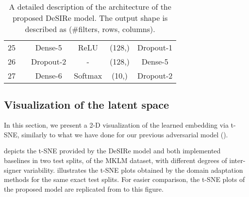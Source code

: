 \begin{table}[t]
\begin{tabular}{c|c|c|c|c|c}
            25                                                          &                                                                 & Dense-5                                                                           & ReLU                                                              & (128,)                & Dropout-1                                                                                \\
            26                                                          &                                                                 & Dropout-2                                                                          & -                                                                 & (128,)                & Dense-5                                                                                  \\
            27                                                          &                                                                 & Dense-6                                                                          & Softmax                                                              & (10,)                 & Dropout-2                                                                                \\
        \end{tabular}
    \caption{A detailed description of the architecture of the proposed DeSIRe model. The output shape is described as (\#filters, rows, columns).}
    \label{table:desire_arch}
\end{table}

\subsection{Visualization of the latent space}
\label{sec:desire_tsne}
In this section, we present a 2-D visualization of the learned embedding via t-SNE, similarly to what we have done for our previous adversarial model ().

 depicts the t-SNE provided by the DeSIRe model and both implemented baselines in two test splits, of the MKLM dataset, with different degrees of inter-signer variability.  illustrates the t-SNE plots obtained by the domain adaptation methods for the same exact test splits. For easier comparison, the t-SNE plots of the proposed model are replicated from  to this figure.

